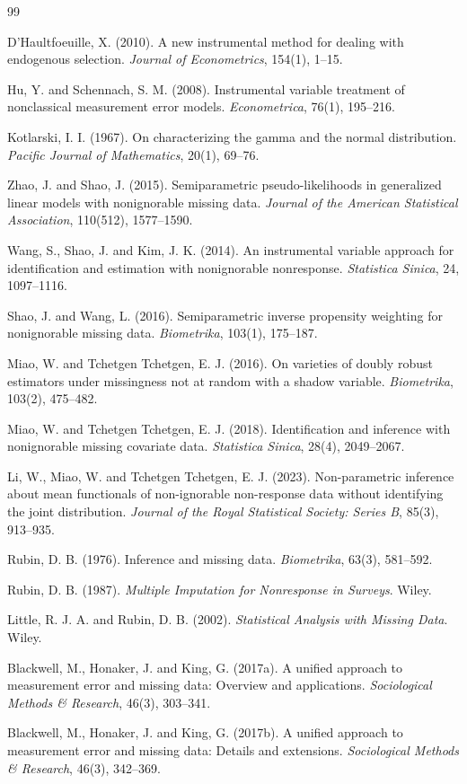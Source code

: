 \documentclass[dvipdfmx,autodetect-engine]{jsarticle}
\newcommand{\1}{\mathbf{1}}
\begin{document}
\begin{thebibliography}{99}

D'Haultfoeuille, X. (2010).
A new instrumental method for dealing with endogenous selection.
\textit{Journal of Econometrics}, 154(1), 1--15.

Hu, Y. and Schennach, S. M. (2008).
Instrumental variable treatment of nonclassical measurement error models.
\textit{Econometrica}, 76(1), 195--216.

Kotlarski, I. I. (1967).
On characterizing the gamma and the normal distribution.
\textit{Pacific Journal of Mathematics}, 20(1), 69--76.

Zhao, J. and Shao, J. (2015).
Semiparametric pseudo-likelihoods in generalized linear models with nonignorable missing data.
\textit{Journal of the American Statistical Association}, 110(512), 1577--1590.

Wang, S., Shao, J. and Kim, J. K. (2014).
An instrumental variable approach for identification and estimation with nonignorable nonresponse.
\textit{Statistica Sinica}, 24, 1097--1116.

Shao, J. and Wang, L. (2016).
Semiparametric inverse propensity weighting for nonignorable missing data.
\textit{Biometrika}, 103(1), 175--187.

Miao, W. and Tchetgen Tchetgen, E. J. (2016).
On varieties of doubly robust estimators under missingness not at random with a shadow variable.
\textit{Biometrika}, 103(2), 475--482.

Miao, W. and Tchetgen Tchetgen, E. J. (2018).
Identification and inference with nonignorable missing covariate data.
\textit{Statistica Sinica}, 28(4), 2049--2067.

Li, W., Miao, W. and Tchetgen Tchetgen, E. J. (2023).
Non-parametric inference about mean functionals of non-ignorable non-response data without identifying the joint distribution.
\textit{Journal of the Royal Statistical Society: Series B}, 85(3), 913--935.

Rubin, D. B. (1976).
Inference and missing data.
\textit{Biometrika}, 63(3), 581--592.

Rubin, D. B. (1987).
\textit{Multiple Imputation for Nonresponse in Surveys}.
Wiley.

Little, R. J. A. and Rubin, D. B. (2002).
\textit{Statistical Analysis with Missing Data}.
Wiley.

Blackwell, M., Honaker, J. and King, G. (2017a).
A unified approach to measurement error and missing data: Overview and applications.
\textit{Sociological Methods \& Research}, 46(3), 303--341.

Blackwell, M., Honaker, J. and King, G. (2017b).
A unified approach to measurement error and missing data: Details and extensions.
\textit{Sociological Methods \& Research}, 46(3), 342--369.

\end{thebibliography}
\end{document}
